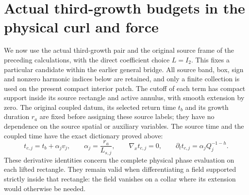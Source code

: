 \section{Actual third-growth budgets in the physical curl and force}
\label{tgq:section}
We now use the actual third-growth pair and the original source frame
of the preceding calculations, with the direct coefficient choice
$L=I_2$. This fixes a particular candidate within the earlier general
bridge. All source band, box, sign and nonzero harmonic indices below
are retained, and only a finite collection is used on the present compact
interior patch. The cutoff of each term has compact support inside its
source rectangle and active annulus, with smooth extension by zero.
The original coupled datum, its selected return time $t_b$ and its
growth duration $r_a$ are fixed before assigning these source labels;
they have no dependence on the source spatial or auxiliary variables.
The source time and the coupled time have the exact dictionary proved
above:
\[
 t_{c,j}=t_b+\alpha_jv_j,\qquad
 \alpha_j=\frac{r_a}{L_{s,j}},\qquad
 \nabla_x t_{c,j}=0,\qquad
 \partial_t t_{c,j}=\alpha_jQ_j^{-1-h}.
\]
These derivative identities concern the complete physical phase
evaluation on each lifted rectangle. They remain valid when differentiating
a field supported strictly inside that rectangle: the field vanishes on
a collar where its extension would otherwise be needed.

